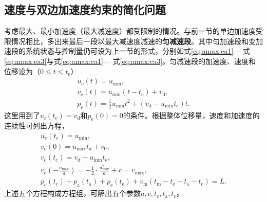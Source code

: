 \subsection{速度与双边加速度约束的简化问题}
考虑最大、最小加速度（最大减速度）都受限制的情况。与前一节的单边加速度受限情况相比，多出来最后一段以最大减速度减速的\textbf{匀减速段}。其中匀加速段和变加速段的系统状态与控制量仍可设为上一节的形式，分别如式\eqref{eq:amax:ea1}--- 式\eqref{eq:amax:ea3}与式\eqref{eq:amax:ca1}--- 式\eqref{eq:amax:ca3}。匀减速段的加速度、速度和位移设为（$0\leq t\leq t_\mathrm{e}$）
\begin{gather}
u_\mathrm{e}(t)=u_{\min},\\
v_\mathrm{e}(t)=u_{\min}(t-t_\mathrm{e})+v_\mathrm{d},\\
p_\mathrm{e}(t)=\frac12 u_{\min}t^2+(v_\mathrm{d}-u_{\min}t_\mathrm{e})t.
\end{gather}
这里用到了$v_\mathrm{e}(t_e)=v_\mathrm{d}$和$p_\mathrm{e}(0)=0$的条件。根据整体位移量，速度和加速度的连续性可列出方程，
\begin{gather}
u_\mathrm{c}(t_\mathrm{c})=u_{\min},\label{eq:amin:1}\\
v_\mathrm{c}(0)=u_{\max}t_\mathrm{a}+v_0,\\
v_\mathrm{c}(t_\mathrm{c})=v_\mathrm{d}-u_{\min}t_\mathrm{e},\\
v_\mathrm{c}(-\frac{u_{\max}}{a})=-\frac12\cdot\frac{u_{\max}^2}{a}+c=v_\mathrm{max},\label{eq:amin:4}\\
p_\mathrm{c}(t_\mathrm{c})+p_\mathrm{a}(t_\mathrm{a})+p_\mathrm{e}(t_\mathrm{e})+v_\mathrm{m}(t_\mathrm{m}-t_\mathrm{e}-t_\mathrm{a}-t_\mathrm{c})=L.\label{eq:amin:5}
\end{gather}
上述五个方程构成方程组，可解出五个参数$a,c,t_\mathrm{e},t_\mathrm{a},t_\mathrm{c}$。

